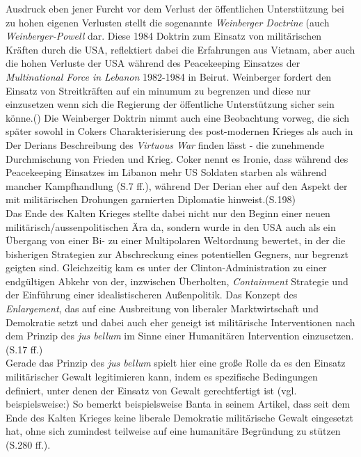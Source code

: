 \documentclass[11pt,a4paper,oneside,numbers=noenddot,bibliography=totocnumbered,DIV=13]{scrartcl}
\begin{document}
Ausdruck eben jener Furcht vor dem Verlust der öffentlichen Unterstützung bei zu hohen eigenen Verlusten stellt die sogenannte \textit{Weinberger Doctrine} (auch \textit{Weinberger-Powell} dar. Diese 1984 Doktrin zum Einsatz von militärischen Kräften durch die USA, reflektiert dabei die Erfahrungen aus Vietnam, aber auch die hohen Verluste der USA während des Peacekeeping Einsatzes der \textit{Multinational Force in Lebanon} 1982-1984 in Beirut. Weinberger fordert den Einsatz von Streitkräften auf ein minumum zu begrenzen und diese nur einzusetzen wenn sich die Regierung der öffentliche Unterstützung sicher sein könne.(\cite{Weinberger28.11.1984})  Die Weinberger Doktrin nimmt auch eine Beobachtung vorweg, die sich später sowohl in Cokers Charakterisierung des post-modernen Krieges als auch in Der Derians Beschreibung des \textit{Virtuous War} finden lässt - die zunehmende Durchmischung von Frieden und Krieg. Coker nennt es Ironie, dass während des Peacekeeping Einsatzes im Libanon mehr US Soldaten starben als während mancher Kampfhandlung (\cite{coker_postmodern_2008}S.7 ff.), während Der Derian eher auf den Aspekt der mit militärischen Drohungen garnierten Diplomatie hinweist.(\cite{DerDerian2001}S.198)\\
Das Ende des Kalten Krieges stellte dabei nicht nur den Beginn einer neuen militärisch/aussenpolitischen Ära da, sondern wurde in den USA auch als ein Übergang von einer Bi- zu einer Multipolaren Weltordnung bewertet, in der die bisherigen Strategien zur Abschreckung eines potentiellen Gegners, nur begrenzt geigten sind. Gleichzeitig  kam es unter der Clinton-Administration zu einer endgültigen Abkehr von der, inzwischen Überholten, \textit{Containment} Strategie und der Einführung einer idealistischeren Außenpolitik. Das Konzept des \textit{Enlargement}, das auf eine Ausbreitung von liberaler Marktwirtschaft und Demokratie setzt und dabei auch eher geneigt ist militärische Interventionen nach dem Prinzip des \textit{jus bellum} im Sinne einer Humanitären Intervention einzusetzen. (\cite{DerDerian2001}S.17 ff.)\\ Gerade das Prinzip des \textit{jus bellum} spielt hier eine große Rolle da es den Einsatz militärischer Gewalt legitimieren kann, indem es spezifische Bedingungen definiert, unter denen der Einsatz von Gewalt gerechtfertigt ist (vgl. beispielsweise:\cite{rengger_just_2002}) So bemerkt beispielsweise Banta in seinem Artikel, dass seit dem Ende des Kalten Krieges keine liberale Demokratie militärische Gewalt eingesetzt hat, ohne sich zumindest teilweise auf eine humanitäre Begründung zu stützen (\cite{banta_virtuous_2011}S.280 ff.).    
\end{document}
